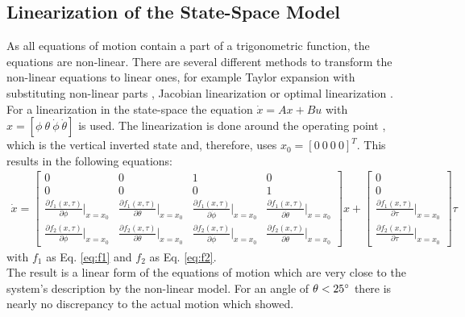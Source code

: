 \subsection{Linearization of the State-Space Model}
As all equations of motion contain a part of a trigonometric function, the 
equations are non-linear. There are several different methods to transform the 
non-linear equations to linear ones, for example Taylor expansion with 
substituting non-linear parts \citep{hamza2015genetic}, Jacobian 
linearization \citep{al2013experimental} or optimal linearization 
\citep{zhang2011optimal}.
 For a linearization in the state-space the equation 
$\dot{x}=Ax+Bu$ with $x=[\phi\ \theta\ \dot{\phi}\ \dot{\theta}]$ is used. The 
linearization is done around the 
operating point \citep{furuta1992swing}, which is the vertical inverted 
state and, therefore, uses $x_0=[0 \ 0\ 0\ 0]^T$. This results in 
the following equations: 
\begin{align}
\dot{x}=
\begin{bmatrix}
0	& 0 &1  &0  \\ 
0	&  0& 0 &  1\\ 
\frac{\partial f_1(x,\tau)}{\partial \phi}\Big|_{x=x_0}	& \frac{\partial 
f_1(x,\tau)}{\partial \theta}\Big|_{x=x_0} & \frac{\partial 
f_1(x,\tau)}{\partial 
\dot{\phi}}\Big|_{x=x_0} & \frac{\partial f_1(x,\tau)}{\partial 
\dot{\theta}}\Big|_{x=x_0} \\ 
\frac{\partial f_2(x,\tau)}{\partial \phi}\Big|_{x=x_0}	& \frac{\partial 
	f_2(x,\tau)}{\partial \theta}\Big|_{x=x_0} & \frac{\partial 
	f_2(x,\tau)}{\partial 
	\dot{\phi}}\Big|_{x=x_0} & \frac{\partial f_2(x,\tau)}{\partial 
	\dot{\theta}}\Big|_{x=x_0} 
\end{bmatrix} 
x +
\begin{bmatrix}
0	\\ 
0	\\ 
\frac{\partial f_1(x,\tau)}{\partial 
	\tau}\Big|_{x=x_0} 	\\
\frac{\partial f_2(x,\tau)}{\partial 
	\tau}\Big|_{x=x_0} 
\end{bmatrix} \tau
\label{eq:liner}
\end{align} with $f_1$ as Eq. \eqref{eq:f1} and $f_2$ as Eq. \eqref{eq:f2}.\\
The result is a linear form of the equations of motion which are very close to 
the system's description by the non-linear model. For an angle of 
$\theta<25\degree$  
there is nearly no discrepancy to the actual motion
which \cite{kurode2011swing} showed.

